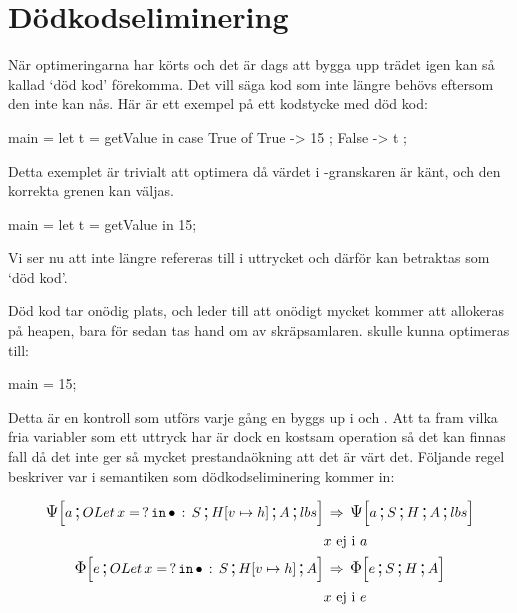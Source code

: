 \documentclass[../Optimise]{subfiles}
\begin{document}
\section{Dödkodseliminering}
\label{sec:DeadCode}

När optimeringarna har körts och det är dags att bygga upp trädet igen kan
så kallad `död kod' förekomma. Det vill säga kod som inte längre 
behövs eftersom den inte kan nås. Här är ett exempel på ett kodstycke med
död kod:

\begin{codeEx}
main = let t = getValue 
       in case True of
              { True  -> 15
              ; False -> t
              };
\end{codeEx}

Detta exemplet är trivialt att optimera då värdet i -granskaren är känt, och 
den korrekta grenen kan väljas.

\begin{codeEx}
main = let t = getValue in 15;
\end{codeEx}


Vi ser nu att  inte längre refereras till i uttrycket  
och därför kan  betraktas som `död kod'. 

Död kod tar onödig plats, och leder till att onödigt mycket kommer att 
allokeras på heapen, bara för sedan tas hand om av skräpsamlaren.  skulle
kunna optimeras till:

\begin{codeEx}
main = 15;
\end{codeEx}

\begin{comment}
Denna process kan mer formellt skrivas som:

\begin{mathpar}
\inferrule
  {t\,\text{ej fri variabel i}\,e_2}
  {\mathtt{let}\,t\,=\,e_1\,\mathtt{in}\,e_2 \Rightarrow e_2}
\;
\end{mathpar}
\end{comment}

Detta är en kontroll som utförs varje gång en  byggs up 
i \iIrr och \iPsi. Att ta fram vilka fria variabler som ett uttryck har är dock en 
kostsam operation så det kan finnas fall då det inte ger så mycket
prestandaökning att det är värt det. Följande regel beskriver
var i semantiken som dödkodseliminering kommer in:

\begin{align*}
\CBNPSI{\cOLet xS}{\heap vh}A{lbs}a & \rulesep \CBNPSI SHA{lbs}a\\
& x \text{ ej i } a \nonumber \\
\CBNIRR{\cOLet xS}{\heap vh}Ae & \rulesep \CBNIRR SHAe\\
& x \text{ ej i } e \nonumber
\end{align*}
\end{document}
